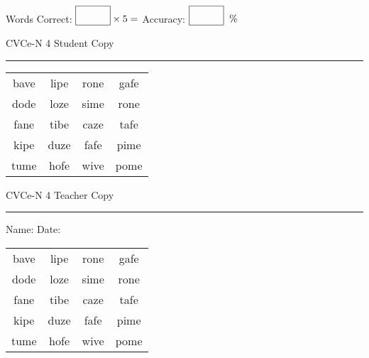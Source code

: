 \documentclass{memoir}
\begin{document}
\small

Words Correct: $\fbox{\phantom{\huge 100}} \times 5 = $ Accuracy: $\fbox{\phantom{\huge 100}}\;\; \%$ 

\vfill

\newpage


\footnotesize \noindent
CVCe-N 4 \hfill Student Copy
\smallskip
\hrule

\Large

\setlength{\tabcolsep}{14pt}
\def\arraystretch{2}

{\selectfont


\begin{vplace}[0.5]
\begin{center}
\begin{tabular}{cccc}
bave & lipe & rone & gafe \\
dode & loze & sime & rone \\
fane & tibe & caze & tafe \\
kipe & duze & fafe & pime \\
tume & hofe & wive & pome \\
\end{tabular}
\end{center}
\end{vplace}

}

\newpage

\footnotesize \noindent
CVCe-N 4 \hfill Teacher Copy
\smallskip
\hrule

\small

\vfill

\noindent
Name: \underline{\hspace{1.75in}} \hfill Date: \underline{\hspace{1in}}

\Large

{\selectfont


\begin{vplace}[0.5]
\begin{center}
\begin{tabular}{cccc}
bave & lipe & rone & gafe \\
dode & loze & sime & rone \\
fane & tibe & caze & tafe \\
kipe & duze & fafe & pime \\
tume & hofe & wive & pome \\
\end{tabular}
\end{center}
\end{vplace}



}
\end{document}
